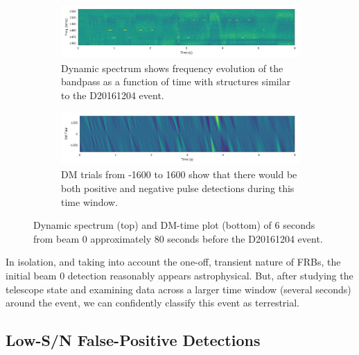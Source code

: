 \documentclass[a4paper,fleqn,usenatbib]{mnras}
\begin{document}
\begin{figure}
    \centering
    \begin{subfigure}[t]{1.0\textwidth}
        \centering\captionsetup{width=.95\linewidth}
        \includegraphics[width=1.0\textwidth]{figures/D20161204_spect_buf21_Beam0.pdf}
        \caption{Dynamic spectrum shows frequency evolution of the bandpass as a
        function of time with structures similar to the D20161204 event.
        }
        \label{fig:beam0_dynamic_spec_80s}
    \end{subfigure}
    \begin{subfigure}[t]{1.0\textwidth}
        \centering\captionsetup{width=.95\linewidth}
        \includegraphics[width=1.0\textwidth]{figures/D20161204_dmtrials_buf21_Beam0.pdf}
        \caption{DM trials from -1600 to 1600 show that there would be both
        positive and negative pulse detections during this time window.
        }
        \label{fig:beam0_dmtrials_80s}
    \end{subfigure}
    \caption{Dynamic spectrum (top) and DM-time plot (bottom) of 6 seconds from
    beam 0 approximately 80 seconds before the D20161204 event.
    }
    \label{fig:beamo0_80s}
\end{figure}

In isolation, and taking into account the one-off, transient nature of FRBs, the
initial beam 0 detection reasonably appears astrophysical. But, after
studying the telescope state and examining data across a larger time window
(several seconds) around the event, we can confidently classify this event as
terrestrial.

\subsection{Low-S/N False-Positive Detections}
\label{sec:low_snr}
\end{document}
